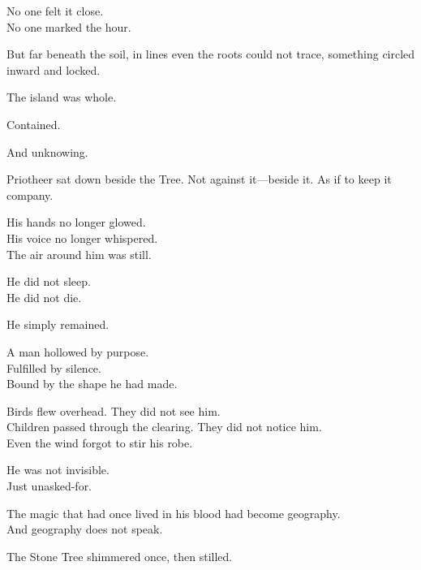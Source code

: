 \documentclass[12pt]{article}
\begin{document}
\vspace{0.5em}
No one felt it close.\\
No one marked the hour.

\vspace{0.5em}
But far beneath the soil, in lines even the roots could not trace, something circled inward and locked.

\vspace{0.5em}
The island was whole.

\vspace{0.5em}
Contained.

\vspace{0.5em}
And unknowing.

\vspace{0.5em}
Priotheer sat down beside the Tree. Not against it---beside it. As if to keep it company.

\vspace{0.5em}
His hands no longer glowed.\\
His voice no longer whispered.\\
The air around him was still.

\vspace{0.5em}
He did not sleep.\\
He did not die.

\vspace{0.5em}
He simply remained.

\vspace{0.5em}
A man hollowed by purpose.\\
Fulfilled by silence.\\
Bound by the shape he had made.

\vspace{0.5em}
Birds flew overhead. They did not see him.\\
Children passed through the clearing. They did not notice him.\\
Even the wind forgot to stir his robe.

\vspace{0.5em}
He was not invisible.\\
Just unasked-for.

\vspace{0.5em}
The magic that had once lived in his blood had become geography.\\
And geography does not speak.

\vspace{0.5em}
The Stone Tree shimmered once, then stilled.
\end{document}
